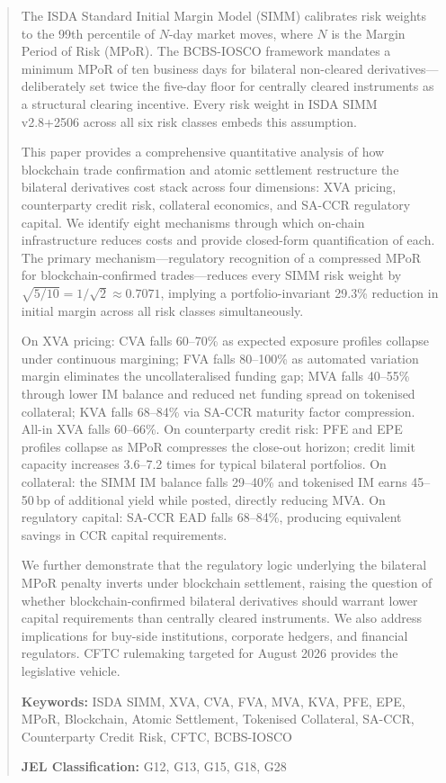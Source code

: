 \documentclass[12pt,letterpaper]{article}
\numberwithin{equation}{section}
\theoremstyle{remark}
\begin{document}
\begin{abstract}
\noindent
The ISDA Standard Initial Margin Model (SIMM) calibrates risk weights to the
99th percentile of $N$-day market moves, where $N$ is the Margin Period of
Risk (MPoR). The BCBS-IOSCO framework mandates a minimum MPoR of ten business
days for bilateral non-cleared derivatives---deliberately set twice the
five-day floor for centrally cleared instruments as a structural clearing
incentive. Every risk weight in ISDA SIMM v2.8+2506 across all six risk
classes embeds this assumption.

This paper provides a comprehensive quantitative analysis of how blockchain
trade confirmation and atomic settlement restructure the bilateral derivatives
cost stack across four dimensions: XVA pricing, counterparty credit risk,
collateral economics, and SA-CCR regulatory capital. We identify eight
mechanisms through which on-chain infrastructure reduces costs and provide
closed-form quantification of each. The primary mechanism---regulatory
recognition of a compressed MPoR for blockchain-confirmed trades---reduces
every SIMM risk weight by $\sqrt{5/10} = 1/\!\sqrt{2} \approx 0.7071$,
implying a portfolio-invariant 29.3\% reduction in initial margin across all
risk classes simultaneously.

On XVA pricing: CVA falls 60--70\% as expected exposure profiles collapse
under continuous margining; FVA falls 80--100\% as automated variation margin
eliminates the uncollateralised funding gap; MVA falls 40--55\% through lower
IM balance and reduced net funding spread on tokenised collateral; KVA falls
68--84\% via SA-CCR maturity factor compression. All-in XVA falls 60--66\%.
On counterparty credit risk: PFE and EPE profiles collapse as MPoR compresses
the close-out horizon; credit limit capacity increases 3.6--7.2 times for
typical bilateral portfolios. On collateral: the SIMM IM balance falls 29--40\%
and tokenised IM earns 45--50\,bp of additional yield while posted, directly
reducing MVA. On regulatory capital: SA-CCR EAD falls 68--84\%, producing
equivalent savings in CCR capital requirements.

We further demonstrate that the regulatory logic underlying the bilateral MPoR
penalty inverts under blockchain settlement, raising the question of whether
blockchain-confirmed bilateral derivatives should warrant lower capital
requirements than centrally cleared instruments. We also address implications
for buy-side institutions, corporate hedgers, and financial regulators. CFTC
rulemaking targeted for August 2026 provides the legislative vehicle.

\vspace{8pt}
\noindent\textbf{Keywords:} ISDA SIMM, XVA, CVA, FVA, MVA, KVA, PFE, EPE,
MPoR, Blockchain, Atomic Settlement, Tokenised Collateral, SA-CCR,
Counterparty Credit Risk, CFTC, BCBS-IOSCO

\vspace{4pt}
\noindent\textbf{JEL Classification:} G12, G13, G15, G18, G28
\end{abstract}
\end{document}
